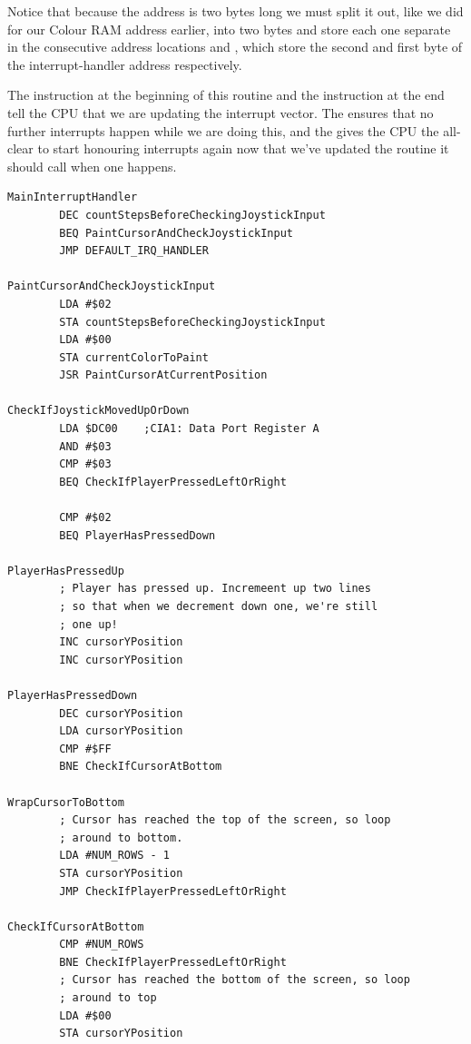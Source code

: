 Notice that because the address is two bytes long we must split it out, like we did for our Colour RAM address earlier, into 
two bytes and store each one separate in the consecutive address locations  and , which store
the second and first byte of the interrupt-handler address respectively. 

The  instruction at the beginning of this routine and the  instruction at the end tell the CPU that we 
are updating the interrupt vector. The  ensures that no further interrupts happen while we are doing this, and the
 gives the CPU the all-clear to start honouring interrupts again now that we've updated the routine it should call
when one happens.


\clearpage
\begin{lstlisting}[caption= This is our interrupt handler\, it runs 60 times a second so has to be fast.]
MainInterruptHandler   
        DEC countStepsBeforeCheckingJoystickInput
        BEQ PaintCursorAndCheckJoystickInput
        JMP DEFAULT_IRQ_HANDLER

PaintCursorAndCheckJoystickInput   
        LDA #$02
        STA countStepsBeforeCheckingJoystickInput
        LDA #$00
        STA currentColorToPaint
        JSR PaintCursorAtCurrentPosition

CheckIfJoystickMovedUpOrDown   
        LDA $DC00    ;CIA1: Data Port Register A
        AND #$03
        CMP #$03
        BEQ CheckIfPlayerPressedLeftOrRight

        CMP #$02
        BEQ PlayerHasPressedDown

PlayerHasPressedUp
        ; Player has pressed up. Incremeent up two lines
        ; so that when we decrement down one, we're still
        ; one up!
        INC cursorYPosition
        INC cursorYPosition

PlayerHasPressedDown   
        DEC cursorYPosition
        LDA cursorYPosition
        CMP #$FF
        BNE CheckIfCursorAtBottom

WrapCursorToBottom
        ; Cursor has reached the top of the screen, so loop
        ; around to bottom.
        LDA #NUM_ROWS - 1
        STA cursorYPosition
        JMP CheckIfPlayerPressedLeftOrRight

CheckIfCursorAtBottom   
        CMP #NUM_ROWS
        BNE CheckIfPlayerPressedLeftOrRight
        ; Cursor has reached the bottom of the screen, so loop
        ; around to top
        LDA #$00
        STA cursorYPosition

\end{lstlisting}
\clearpage


